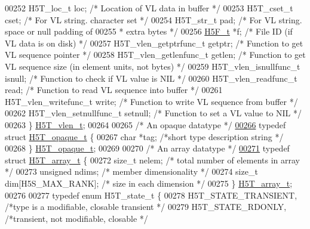 \begin{DoxyCode}
00252     H5T\_loc\_t       loc;    \textcolor{comment}{/* Location of VL data in buffer */}
00253     H5T\_cset\_t          cset;   \textcolor{comment}{/* For VL string. character set */}
00254     H5T\_str\_t           pad;    \textcolor{comment}{/* For VL string.  space or null padding of}
00255 \textcolor{comment}{                                 * extra bytes */}
00256     \hyperlink{struct_h5_f__t}{H5F\_t} *f;                   \textcolor{comment}{/* File ID (if VL data is on disk) */}
00257     H5T\_vlen\_getptrfunc\_t getptr;   \textcolor{comment}{/* Function to get VL sequence pointer */}
00258     H5T\_vlen\_getlenfunc\_t getlen;   \textcolor{comment}{/* Function to get VL sequence size (in element units, not bytes) */}
00259     H5T\_vlen\_isnullfunc\_t isnull;   \textcolor{comment}{/* Function to check if VL value is NIL */}
00260     H5T\_vlen\_readfunc\_t read;   \textcolor{comment}{/* Function to read VL sequence into buffer */}
00261     H5T\_vlen\_writefunc\_t write; \textcolor{comment}{/* Function to write VL sequence from buffer */}
00262     H5T\_vlen\_setnullfunc\_t setnull; \textcolor{comment}{/* Function to set a VL value to NIL */}
00263 \} \hyperlink{struct_h5_t__vlen__t}{H5T\_vlen\_t};
00264 
00265 \textcolor{comment}{/* An opaque datatype */}
\hyperlink{struct_h5_t__opaque__t}{00266} \textcolor{keyword}{typedef} \textcolor{keyword}{struct }\hyperlink{struct_h5_t__opaque__t}{H5T\_opaque\_t} \{
00267     \textcolor{keywordtype}{char}        *tag;       \textcolor{comment}{/*short type description string      */}
00268 \} \hyperlink{struct_h5_t__opaque__t}{H5T\_opaque\_t};
00269 
00270 \textcolor{comment}{/* An array datatype */}
\hyperlink{struct_h5_t__array__t}{00271} \textcolor{keyword}{typedef} \textcolor{keyword}{struct }\hyperlink{struct_h5_t__array__t}{H5T\_array\_t} \{
00272     \textcolor{keywordtype}{size\_t}  nelem;      \textcolor{comment}{/* total number of elements in array */}
00273     \textcolor{keywordtype}{unsigned}    ndims;      \textcolor{comment}{/* member dimensionality        */}
00274     \textcolor{keywordtype}{size\_t}  dim[H5S\_MAX\_RANK];  \textcolor{comment}{/* size in each dimension       */}
00275 \} \hyperlink{struct_h5_t__array__t}{H5T\_array\_t};
00276 
00277 \textcolor{keyword}{typedef} \textcolor{keyword}{enum} H5T\_state\_t \{
00278     H5T\_STATE\_TRANSIENT,        \textcolor{comment}{/*type is a modifiable, closable transient */}
00279     H5T\_STATE\_RDONLY,           \textcolor{comment}{/*transient, not modifiable, closable */}

\end{DoxyCode}
